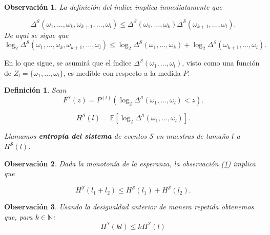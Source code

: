 \documentclass{report}
\newtheorem{dfn}{Definición}[section]
\newtheorem{obs}{Observación}[section]
\begin{document}
\begin{obs}\label{obs:desigualdad triangular indice de un sistema}
    La definición del índice implica inmediatamente que  

    \begin{equation*}
    \Delta^{\mathcal{S}}(\omega_1, \dots, \omega_{k}, \omega_{k+1}, \dots,\omega_l) \leq \Delta^{\mathcal{S}}(\omega_1, \dots, \omega_k) \Delta^{\mathcal{S}}(\omega_{k+1}, \dots, \omega_l).
    \end{equation*}
    De aquí se sigue que  
    \begin{equation*}
    \log_2 \Delta^{\mathcal{S}}(\omega_1, \dots, \omega_{k}, \omega_{k+1}, \dots,\omega_l) \leq \log_2 \Delta^{\mathcal{S}}(\omega_1, \dots, \omega_k) + \log_2 \Delta^{\mathcal{S}}(\omega_{k+1}, \dots, \omega_l).
    \end{equation*}\newline
\end{obs}


En lo que sigue, se asumirá que el índice \( \Delta^{\mathcal{S}}(\omega_1, \dots, \omega_l) \), visto como una función de 
\( Z_l = \{\omega_1, \dots, \omega_l\} \), es medible con respecto a la medida \( P \).\newline

\begin{dfn}
    Sean  
    \[
    F^{\mathcal{S}}(z) = P^{(l)}\left(\log_2 \Delta^{\mathcal{S}}(\omega_1, \dots, \omega_l) < z \right).
    \]
     
    \[
    H^{\mathcal{S}}(l) = \mathbb{E} \left[ \log_2 \Delta^{\mathcal{S}}(\omega_1, \dots, \omega_l) \right].
    \]

    Llamamos \textbf{entropía del sistema} de eventos \( \mathcal{S} \) en muestras de tamaño \( l \) a  $H^{\mathcal{S}}(l)$.\newline

\end{dfn}

\begin{obs} \label{subaditividad de la entropia 1}
    Dada la monotonía de la esperanza, la observación (\ref{obs:desigualdad triangular indice de un sistema}) implica que  
    
    \[
        H^{\mathcal{S}}(l_1 + l_2) \leq H^{\mathcal{S}}(l_1) + H^{\mathcal{S}}(l_2).
    \]
\end{obs}

\begin{obs} \label{subaditivdad de la entropia 2}
    Usando la desigualdad anterior de manera repetida obtenemos que, para $k\in \mathbb{N}$:
        \[
        H^{\mathcal{S}}(kl) \leq k H^{\mathcal{S}}(l)
    \]
\end{obs}
\end{document}
